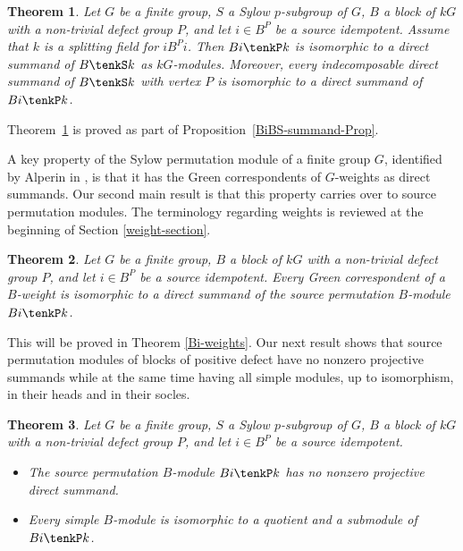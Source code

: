 \documentclass{amsart}
\theoremstyle{plain}\newtheorem{Theorem}{Theorem}[section]
\theoremstyle{plain}\newtheorem{Conjecture}[Theorem]{Conjecture}
\theoremstyle{plain}\newtheorem{Corollary}[Theorem]{Corollary}
\theoremstyle{plain}\newtheorem{Lemma}[Theorem]{Lemma}
\theoremstyle{plain}\newtheorem{Proposition}[Theorem]{Proposition}
\theoremstyle{definition}\newtheorem{Definition}[Theorem]{Definition}
\theoremstyle{definition}\newtheorem{Example}[Theorem]{Example}
\theoremstyle{definition}\newtheorem{Examples}[Theorem]{Examples}
\theoremstyle{definition}\newtheorem{Exercise}[Theorem]{Exercise}
\theoremstyle{definition}\newtheorem{Notation}[Theorem]{Notation}
\theoremstyle{definition}\newtheorem{Remark}[Theorem]{Remark}
\theoremstyle{definition}\newtheorem{Remarks}[Theorem]{Remarks}
\theoremstyle{plain}\newtheorem{Statement}[Theorem]{}
\begin{document}
\begin{Theorem} \label{Bi-summand} 
Let $G$ be a finite group,  $S$ a Sylow $p$-subgroup of $G$,  $B$ a block of $kG$ 
with a non-trivial defect group $P$, and let $i\in B^P$  be a source idempotent. 
Assume that $k$ is a splitting field for $iB^Pi$.  Then  $Bi\tenkP k$ is isomorphic 
to a direct  summand of   $B\tenkS k$  as  $kG$-modules. Moreover, every 
indecomposable direct summand of $B\tenkS k$ with vertex $P$ is isomorphic 
to a direct summand of $Bi\tenkP k$. 
\end{Theorem} 

Theorem~\ref{Bi-summand} is proved   as part  of 
Proposition~\ref{BiBS-summand-Prop}.

\medskip
A key property  of  the  Sylow permutation   module of a finite group $G$, 
identified by Alperin in \cite[Lemma 1]{Alp87},   is that   it   has the Green  
correspondents of   $G$-weights as direct summands.  Our second main 
result is that this property carries over to source permutation modules.  
The terminology regarding weights is  reviewed at the beginning of 
Section \ref{weight-section}.

\begin{Theorem} \label{Bi-weight-thm}
Let $G$ be a finite group,   $B$ a block of $kG$ 
with a non-trivial defect group $P$, and let $i\in B^P$  be a source idempotent.
Every Green correspondent of a $B$-weight is isomorphic to a direct summand
of the source permutation $B$-module $Bi\tenkP k$.
\end{Theorem}

This will be proved in Theorem \ref{Bi-weights}.   
 Our next result  shows that source permutation  modules   of blocks of 
 positive  defect   have no nonzero  projective  summands while at the 
 same time having all simple  modules, up to isomorphism,  in their  heads 
 and  in their  socles.

\begin{Theorem} \label{Bi-no-projective-summand-thm}
Let $G$ be a finite group,  $S$ a Sylow $p$-subgroup of $G$,  $B$ a block of $kG$ 
with a non-trivial defect group $P$, and let $i\in B^P$  be a source idempotent.
\begin{itemize}
\item[{\rm (i)}]
The source permutation $B$-module $Bi\tenkP k$ has no nonzero projective  
direct summand. 
\item[{\rm (ii)}] 
Every simple $B$-module is isomorphic to a quotient and a  submodule of  
$Bi\tenkP k$.
\end{itemize}
\end{Theorem}
\end{document}
